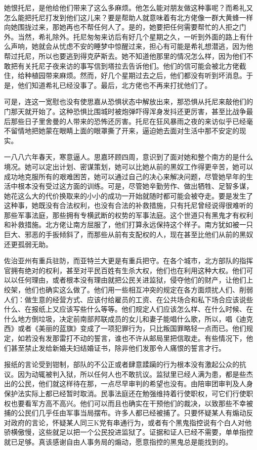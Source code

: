 \par 她恨托尼，是他给他们带来了这么多麻烦。他怎么能对朋友做这种事呢？而希礼又怎么能把托尼打发到他们这儿来？要是帮助人就意味着有北方佬像一群大黄蜂一样向她围拢过来，那她再也不帮任何人了。是的，她要把任何需要帮忙的人拒之门外。当然，希礼除外。托尼匆匆来访后有好几个星期之久，一听到外面的路上有什么声响，她就会从忧虑不安的睡梦中惊醒过来，担心有可能是希礼想潜逃，因为他帮过托尼，所以也要逃到得克萨斯去。她不知道他那里的情况怎么样，因为他们不敢把有关托尼子夜来访的事写信到塔拉去告诉他们。他们的信可能会被北方佬截住，给种植园带来麻烦。然而，好几个星期过去之后，他们都没有听到坏消息。于是，他们知道希礼已经没事了。最后，北方佬也不再来打扰他们了。
\par 可是，连这一宽慰也没有使思嘉从恐惧状态中解放出来，那恐惧从托尼来敲他们的门那天就开始了。这种恐惧比围城时被炮弹吓得浑身发抖还更厉害，甚至比战争最后那些日子里舍曼的人带来的恐怖还厉害。托尼在狂风暴雨之夜的来访似乎已经毫不留情地把她蒙在眼睛上面的眼罩撕了开来，逼迫她去面对生活中那不安定的现实。
\par 一八八六年春天，寒意逼人。思嘉环顾四周，意识到了面对她和整个南方的是什么境况。她可以定出计划、密谋策划，她可以比她从前的黑奴工作得更辛苦，她可以成功地克服所有的艰难困苦，她可以通过自己的决心来解决问题，尽管她早年的生活中根本没有受过这方面的训练。可是，尽管她辛勤劳作、做出牺牲、足智多谋，她花这么大的代价换取来的小小的成功一开始就随时都可能会被夺走。要是发生了这种事，她既没有合法权利，也没有合法的补救措施，只有托尼曾经说得很难听的那些军事法庭，那些拥有专横武断的权势的军事法庭。这个世道只有黑鬼才有权利和补救措施。北方佬让南方屈服了，他们打算永远保持这个样子。南方犹如被一只巨大、邪恶的手扳倾斜了，而那些从前有支配权的人，现在甚至比他们从前的黑奴还更孤弱无助。
\par 佐治亚州有重兵驻防，而亚特兰大更是有重兵把守。在各个城市，北方部队的指挥官拥有绝对的权利，甚至对平民百姓有生杀大权，他们也在利用这种大权。他们可以以任何理由，或者根本没有理由就把公民关进监狱，侵夺他们的财产，让他们上绞架，他们也确实这么做了。他们用一些相互冲突的规定在各方面烦扰人们、削弱人们：做生意的经营方式、应该付给雇员的工资、在公共场合和私下场合应该说些什么、在报纸上又应该写些什么等等。他们规定人们应该怎么样、在什么时候、在什么地方倒垃圾，决定前南部邦联成员的女儿和妻子能唱什么歌，所以，唱《迪克西》或者《美丽的蓝旗》变成了一项犯罪行为，只比叛国罪略轻一点而已。他们规定，如若没有发那雷打不动的誓言，谁也不许从邮局里把信取走。有些情况下，他们甚至禁止发给新婚夫妇结婚证书，除非他们发那令人痛恨的誓言才行。
\par 报纸的言论受到钳制，部队的不公正或者肆意蹂躏的行为根本没有激起公众的抗议。因为动辄被判入狱，所以任何人也不敢抗议。监狱里已经人满为患，都是些杰出的公民，他们就这样待在那，一点尽早审判的希望也没有。由陪审团审判及人身保护法实际上都已经暂时取消。民事法庭还在勉强维持着行使职权，可它们行使职权也要看军方高不高兴。他们可以而且也确实在干预他们的裁决，以致那些不幸被捕的公民们几乎任由军事当局摆布。许多人都已经被捕了。只要怀疑某人有煽动反对政府的言论，怀疑某人同三K党有串通行为，或者有个黑鬼指控说有个白人对他骄横傲慢，这些就足以把一个公民投进监狱了。证据和证人已经不需要，单单指控就已足够。真该感谢自由人事务局的煽动，愿意指控的黑鬼总是能找到的。
